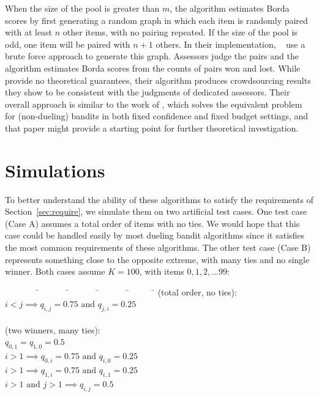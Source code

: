 When the size of the pool is greater than $m$, the algorithm estimates Borda scores by first generating a random graph in which each item is randomly paired with at least $n$ other items, with no pairing repeated. If the size of the pool is odd, one item will be paired with $n + 1$ others. In their implementation, ~\citet{cvs21} use a brute force approach to generate this graph. Assessors judge the pairs and the algorithm estimates Borda scores from the counts of pairs won and lost. While \citet{cvs21} provide no theoretical guarantees, their algorithm produces crowdsourcing results they show to be consistent with the judgments of dedicated assessors. Their overall approach is similar to the work of \citet{karnin13}, which solves the equivalent problem for (non-dueling) bandits in both fixed confidence and fixed budget settings, and that paper might provide a starting point for further theoretical investigation.

\section{Simulations}
\label{sec:sim}

To better understand the ability of these algorithms to satisfy the requirements of Section~\ref{sec:require}, we simulate them on two artificial test cases. One test case (Case A) assumes a total order of items with no ties. We would hope that this case could be handled easily by most dueling bandit algorithms since it satisfies the most common requirements of these algorithms. The other test case (Case B) represents something close to the opposite extreme, with many ties and no single winner. Both cases assume $K = 100$, with items $0, 1, 2, ... 99$:

\begin{tabbing}
\ \ \ \ \ \ \ \= \ \ \ \ \ \ \ \= \ \ \ \ \ \ \ \= \ \ \ \ \ \ \ \= \ \ \ \ \ \ \ \=\kill
{} (total order, no ties):\\
\>\>$i < j \implies q_{i,j} = 0.75 \mbox{\ and\ } q_{j,i} = 0.25$\\
\\
 (two winners, many ties):\\
\>\>$q_{0,1} = q_{1,0} = 0.5$\\
\>\>$i > 1 \implies q_{0,i} = 0.75 \mbox{\ and\ } q_{i,0} = 0.25$\\
\>\>$i > 1 \implies q_{1,i} = 0.75 \mbox{\ and\ } q_{i,1} = 0.25$\\
\>\>$i > 1 \mbox{\ and\ } j > 1 \implies q_{i,j} = 0.5$
\end{tabbing}

